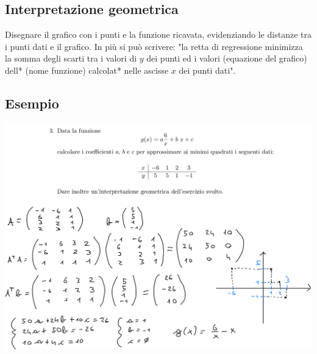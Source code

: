 \documentclass[10pt]{article}
\begin{document}
\subsection{Interpretazione geometrica}
Disegnare il grafico con i punti e la funzione ricavata, evidenziando le distanze tra i punti dati e il grafico. In più si può scrivere: "la retta di regressione minimizza la somma degli scarti tra i valori di $y$ dei punti ed i valori (equazione del grafico) dell* (nome funzione) calcolat* nelle ascisse $x$ dei punti dati".
\subsection{Esempio}
\begin{center}
    \includegraphics[scale=0.4]{es3pt2.png}
\end{center}
\end{document}
